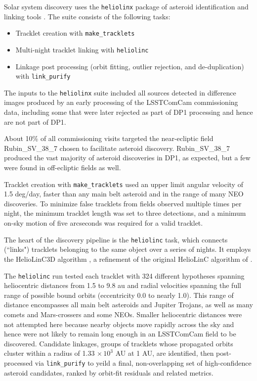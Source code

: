 Solar system discovery uses the {\tt heliolinx} package of asteroid identification and linking tools \citep{heliolinx}.
The suite consists of the following tasks:
\begin{itemize}
    \item Tracklet creation with {\tt make\_tracklets}
    \item Multi-night \gls{tracklet} linking with {\tt heliolinc}
    \item Linkage post processing (orbit fitting, outlier rejection, and de-duplication) with {\tt link\_purify}
\end{itemize}

The inputs to the \texttt{heliolinx} suite included all sources detected in difference images produced by an early processing of the \gls{LSSTComCam} commissioning data,  including some that were later rejected as part of \gls{DP1} processing and hence are not part of \gls{DP1}.

About 10\% of all commissioning visits targeted the near-ecliptic field Rubin\_SV\_38\_7 chosen to facilitate asteroid discovery.
Rubin\_SV\_38\_7 produced the vast majority of asteroid discoveries in DP1, as expected, but a few were found in off-ecliptic fields as well.

Tracklet creation with \texttt{make\_tracklets} used an upper limit angular velocity of 1.5 \gls{deg}/day, faster than any main belt asteroid and in the range of many \gls{NEO} discoveries.
To minimize false tracklets from fields observed multiple times per night, the minimum \gls{tracklet} length was set to three detections, and a minimum on-sky motion of five arcseconds was required for a valid \gls{tracklet}.

The heart of the discovery \gls{pipeline} is the \texttt{heliolinc} task, which connects (``links") tracklets belonging to the same object over a series of nights.
It employs the HelioLinC3D algorithm \citep{2020DPS....5221101E,2022DPS....5450404H}, a refinement of the original HelioLinC algorithm of \citet{2018AJ....156..135H}.

The \texttt{heliolinc} run tested each \gls{tracklet} with 324 different hypotheses spanning heliocentric distances from 1.5 to 9.8 \gls{au} and radial velocities spanning the full range of possible bound orbits (eccentricity 0.0 to nearly 1.0).
This range of distance encompasses all main belt asteroids and Jupiter Trojans, as well as many comets and Mars-crossers and some \glspl{NEO}.
Smaller heliocentric distances were not attempted here because nearby objects move rapidly across the sky and hence were not likely to remain long enough in an \gls{LSSTComCam} field to be discovered.
Candidate linkages, groups of tracklets whose propagated orbits cluster within a radius of 1.33 $\times\,10^{3}$ AU  at 1 AU, 
are identified, then post-processed via \texttt{link\_purify} to yeild a final, non‐overlapping set of high-confidence asteroid candidates, ranked by orbit-fit residuals and related metrics.
